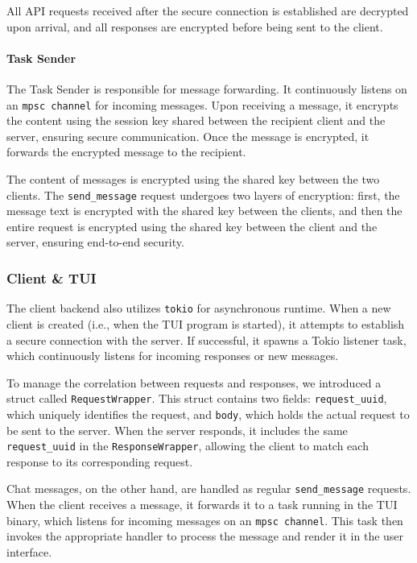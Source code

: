 \noindent All API requests received after the secure connection is established are decrypted upon arrival, and all responses are encrypted before being sent to the client. 

\paragraph{Task Sender}  
\sloppy  
The Task Sender is responsible for message forwarding. It continuously listens on an \texttt{mpsc channel} for incoming messages. Upon receiving a message, it encrypts the content using the session key shared between the recipient client and the server, ensuring secure communication. Once the message is encrypted, it forwards the encrypted message to the recipient.  

\noindent  
The content of messages is encrypted using the shared key between the two clients. The \texttt{send\_message} request undergoes two layers of encryption: first, the message text is encrypted with the shared key between the clients, and then the entire request is encrypted using the shared key between the client and the server, ensuring end-to-end security.

\subsubsection{Client \& TUI}  
The client backend also utilizes \texttt{tokio} for asynchronous runtime. When a new client is created (i.e., when the TUI program is started), it attempts to establish a secure connection with the server. If successful, it spawns a Tokio listener task, which continuously listens for incoming responses or new messages.  

\noindent To manage the correlation between requests and responses, we introduced a struct called \texttt{RequestWrapper}. This struct contains two fields: \texttt{request\_uuid}, which uniquely identifies the request, and \texttt{body}, which holds the actual request to be sent to the server. When the server responds, it includes the same \texttt{request\_uuid} in the \texttt{ResponseWrapper}, allowing the client to match each response to its corresponding request.  

\noindent Chat messages, on the other hand, are handled as regular \texttt{send\_message} requests. When the client receives a message, it forwards it to a task running in the TUI binary, which listens for incoming messages on an \texttt{mpsc channel}. This task then invokes the appropriate handler to process the message and render it in the user interface.

